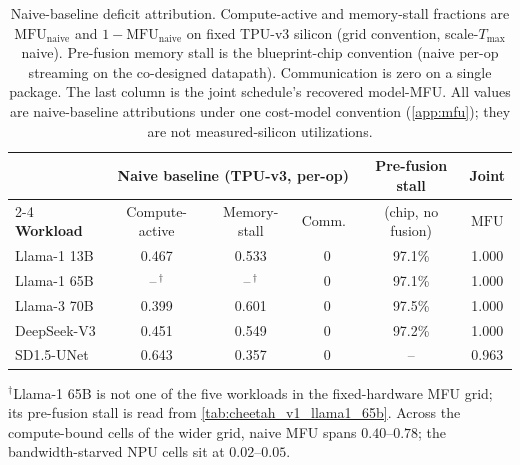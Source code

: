 \begin{table}[ht!]
\centering
\caption{Naive-baseline deficit attribution. Compute-active and memory-stall
fractions are $\mathrm{MFU}_{\mathrm{naive}}$ and $1-\mathrm{MFU}_{\mathrm{naive}}$
on fixed TPU-v3 silicon (grid convention, scale-$T_{\max}$ naive). Pre-fusion
memory stall is the blueprint-chip convention (naive per-op streaming on the
co-designed datapath). Communication is zero on a single package. The last
column is the joint schedule's recovered model-MFU. All values are
naive-baseline attributions under one cost-model convention (\cref{app:mfu});
they are not measured-silicon utilizations.}
\label{tab:deficit_perop}
\small
\begin{tabular}{@{}lccccc@{}}
\toprule
& \multicolumn{3}{c}{\textbf{Naive baseline (TPU-v3, per-op)}}
& \textbf{Pre-fusion stall} & \textbf{Joint} \\
\cmidrule(lr){2-4}
\textbf{Workload} & Compute-active & Memory-stall & Comm.\ & (chip, no fusion)
& $\mathrm{MFU}$ \\
\midrule
Llama-1 13B  & 0.467 & 0.533 & 0 & 97.1\% & 1.000 \\
Llama-1 65B  & --\,$^{\dagger}$ & --\,$^{\dagger}$ & 0 & 97.1\% & 1.000 \\
Llama-3 70B  & 0.399 & 0.601 & 0 & 97.5\% & 1.000 \\
DeepSeek-V3  & 0.451 & 0.549 & 0 & 97.2\% & 1.000 \\
SD1.5-UNet   & 0.643 & 0.357 & 0 & --      & 0.963 \\
\bottomrule
\end{tabular}

\vspace{2pt}
{\footnotesize $^{\dagger}$Llama-1 65B is not one of the five workloads in the
fixed-hardware MFU grid; its pre-fusion stall is read from
\cref{tab:cheetah_v1_llama1_65b}. Across the compute-bound cells of the wider
grid, naive MFU spans $0.40$--$0.78$; the bandwidth-starved NPU cells sit at
$0.02$--$0.05$.}
\end{table}


